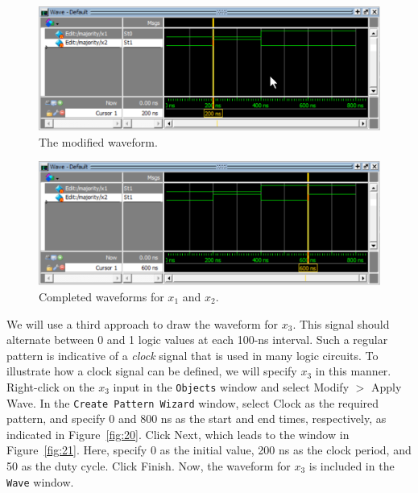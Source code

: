 \documentclass[11pt, twoside, pdftex]{article}
\begin{document}
\begin{figure}[H]
   \begin{center}
      \includegraphics[scale=1.0]{figures/figure18.png}
   \caption{The modified waveform.} 
	 \label{fig:18}
	 \end{center}
\end{figure}

\begin{figure}[H]
   \begin{center}
      \includegraphics[scale=1.0]{figures/figure19.png}
   \caption{Completed waveforms for $x_1$ and $x_2$.} 
	 \label{fig:19}
	 \end{center}
\end{figure}

We will use a third approach to draw the waveform for $x_3$. This signal
should alternate between 0 and 1 logic values at each 100-ns interval.
Such a regular pattern is indicative of a {\it clock} signal that is used in many logic circuits.
To illustrate how a clock signal can be defined, we will specify $x_3$ in this manner.
Right-click on the $x_3$ input in the \texttt{Objects} window 
and select {\sf Modify $>$ Apply Wave}. 
In the \texttt{Create Pattern Wizard} window, select {\sf Clock} 
as the required pattern, and specify 
0 and 800 ns as the start and end times, respectively, as indicated in Figure~\ref{fig:20}.
Click {\sf Next}, which leads to the window in Figure~\ref{fig:21}. Here, specify 0 as the 
initial value, 200 ns as the clock period, and 50 as the duty cycle. Click {\sf Finish}.
Now, the waveform for $x_3$ is included in the \texttt{Wave} window.
\end{document}
